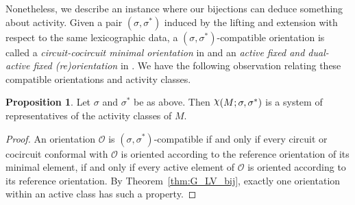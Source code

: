 \documentclass[12pt]{amsart}
\numberwithin{equation}{section}
\theoremstyle{definition}
\newtheorem{proposition}[theorem]{Proposition}
\newcommand{\Ocal}{{\mathcal O}}
\DeclareRobustCommand{\rchi}{{\mathpalette\irchi\relax}}
\newcommand{\irchi}[2]{\raisebox{\depth}{$#1\chi$}}
\begin{document}
Nonetheless, we describe an instance where our bijections can deduce something about activity.
Given a pair $(\sigma,\sigma^*)$ induced by the lifting and extension with respect to the same lexicographic data, a $(\sigma,\sigma^*)$-compatible orientation is called a {\em circuit-cocircuit minimal orientation} in \cite{Bac_PO} and an {\em active fixed and dual-active fixed (re)orientation} in \cite{GLV_AB2b}. We have the following observation relating these compatible orientations and activity classes.


\begin{proposition}
Let $\sigma$ and $\sigma^*$ be as above. Then 
$\rchi(M;\sigma,\sigma^*)$ is a system of representatives of the activity classes of $M$.
\end{proposition}

\begin{proof}
An orientation $\Ocal$ is $(\sigma,\sigma^*)$-compatible if and only if every circuit or cocircuit conformal with $\Ocal$ is oriented according to the reference orientation of its minimal element, if and only if every active element of $\Ocal$ is oriented according to its reference orientation.
By Theorem~\ref{thm:G_LV_bij}, exactly one orientation within an active class has such a property.
\end{proof}
\end{document}
